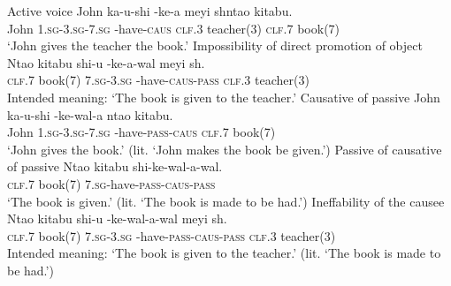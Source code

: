 \begin{exe}
\ex
\begin{xlist}
\ex Active voice
\gll John ka-u-shi -ke-\textbeltl a meyi sh\textramshorns nta\textbeltl o kitabu. \\
John \textsc{1.sg}-\textsc{3.sg}-\textsc{7.sg} -have-\textsc{caus} \textsc{clf.3} teacher(3) \textsc{clf.7} book(7) \\
\trans `John gives the teacher the book.'
\ex Impossibility of direct promotion of object
\gll * Nta\textbeltl o kitabu shi-u {-ke-\textbeltl a-wal\textramshorns} meyi sh\textramshorns. \\
{} \textsc{clf.7} book(7) \textsc{7.sg}-\textsc{3.sg} -have-\textsc{caus}-\textsc{pass} \textsc{clf.3} teacher(3) \\
\trans Intended meaning: `The book is given to the teacher.'
\ex Causative of passive
\gll John ka-u-shi -ke-wal\textramshorns-\textbeltl a nta\textbeltl o kitabu. \\
John \textsc{1.sg}-\textsc{3.sg}-\textsc{7.sg} -have-\textsc{pass}-\textsc{caus} \textsc{clf.7} book(7) \\
\trans `John gives the book.' (lit. `John makes the book be given.')
\ex Passive of causative of passive
\gll Nta\textbeltl o kitabu shi-ke-wal\textramshorns-\textbeltl a-wal\textramshorns. \\
\textsc{clf.7} book(7) \textsc{7.sg}-have-\textsc{pass}-\textsc{caus}-\textsc{pass} \\
\trans `The book is given.' (lit. `The book is made to be had.')
\ex Ineffability of the causee
\gll * Nta\textbeltl o kitabu shi-u {-ke-wal\textramshorns-\textbeltl a-wal\textramshorns} meyi sh\textramshorns. \\
{} \textsc{clf.7} book(7) \textsc{7.sg}-\textsc{3.sg} -have-\textsc{pass}-\textsc{caus}-\textsc{pass} \textsc{clf.3} teacher(3) \\
\trans Intended meaning: `The book is given to the teacher.' (lit. `The book is made to be had.')
\end{xlist}
\end{exe}

